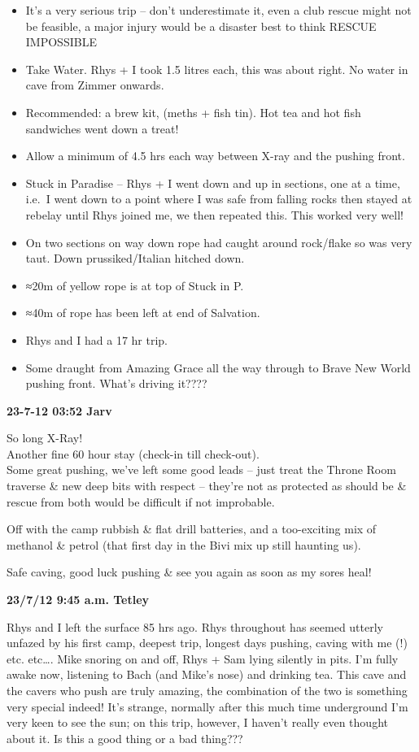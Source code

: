 \begin{itemize}
\tightlist
\item
  It's a very serious trip -- don't underestimate it, even a club rescue
  might not be feasible, a major injury would be a disaster best to
  think RESCUE IMPOSSIBLE
\item
  Take Water. Rhys + I took 1.5 litres each, this was about right. No
  water in cave from Zimmer onwards.
\item
  Recommended: a brew kit, (meths + fish tin). Hot tea and hot fish
  sandwiches went down a treat!
\item
  Allow a minimum of 4.5 hrs each way between X-ray and the pushing
  front.
\item
  Stuck in Paradise -- Rhys + I went down and up in sections, one at a
  time, i.e.~I went down to a point where I was safe from falling rocks
  then stayed at rebelay until Rhys joined me, we then repeated this.
  This worked very well!
\item
  On two sections on way down rope had caught around rock/flake so was
  very taut. Down prussiked/Italian hitched down.
\item
  ≈20m of yellow rope is at top of Stuck in P.
\item
  ≈40m of rope has been left at end of Salvation.
\item
  Rhys and I had a 17 hr trip.
\item
  Some draught from Amazing Grace all the way through to Brave New World
  pushing front. What's driving it????
\end{itemize}

\textbf{23-7-12 03:52 Jarv}

So long X-Ray!\\
Another fine 60 hour stay (check-in till check-out).\\
Some great pushing, we've left some good leads -- just treat the Throne
Room traverse \& new deep bits with respect -- they're not as protected
as should be \& rescue from both would be difficult if not improbable.

Off with the camp rubbish \& flat drill batteries, and a too-exciting
mix of methanol \& petrol (that first day in the Bivi mix up still
haunting us).

Safe caving, good luck pushing \& see you again as soon as my sores
heal!

\textbf{23/7/12 9:45 a.m. Tetley}

Rhys and I left the surface 85 hrs ago. Rhys throughout has seemed
utterly unfazed by his first camp, deepest trip, longest days pushing,
caving with me (!) etc. etc\ldots{}. Mike snoring on and off, Rhys + Sam
lying silently in pits. I'm fully awake now, listening to Bach (and
Mike's nose) and drinking tea. This cave and the cavers who push are
truly amazing, the combination of the two is something very special
indeed! It's strange, normally after this much time underground I'm very
keen to see the sun; on this trip, however, I haven't really even
thought about it. Is this a good thing or a bad thing???

